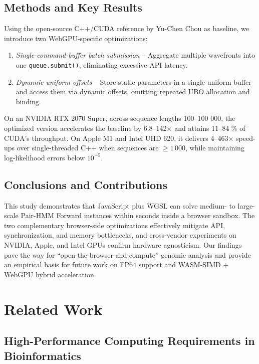 \documentclass[PhD]{PHlab-thesis}
\begin{document}
\section{Methods and Key Results}
Using the open-source C++/CUDA reference by Yu-Chen Chou \cite{Chou2024-github} as baseline, we introduce two WebGPU-specific optimizations:

\begin{enumerate}
  \item \textit{Single-command-buffer batch submission} – Aggregate multiple wavefronts into one \verb|queue.submit()|, eliminating excessive API latency.
  \item \textit{Dynamic uniform offsets} – Store static parameters in a single uniform buffer and access them via dynamic offsets, omitting repeated UBO allocation and binding.
\end{enumerate}

On an NVIDIA RTX 2070 Super, across sequence lengths 100–100 000, the optimized version accelerates the baseline by 6.8–142$\times$ and attains 11–84 \% of CUDA's throughput. On Apple M1 and Intel UHD 620, it delivers 4–463$\times$ speed-ups over single-threaded C++ when sequences are $\ge1\,000$, while maintaining log-likelihood errors below $10^{-5}$.

\section{Conclusions and Contributions}
This study demonstrates that JavaScript plus WGSL can solve medium- to large-scale Pair-HMM Forward instances within seconds inside a browser sandbox. The two complementary browser-side optimizations effectively mitigate API, synchronization, and memory bottlenecks, and cross-vendor experiments on NVIDIA, Apple, and Intel GPUs confirm hardware agnosticism.  
Our findings pave the way for “open-the-browser-and-compute” genomic analysis and provide an empirical basis for future work on FP64 support and WASM-SIMD + WebGPU hybrid acceleration.





\chapter{Related Work}

\section{High-Performance Computing Requirements in Bioinformatics}
\end{document}
